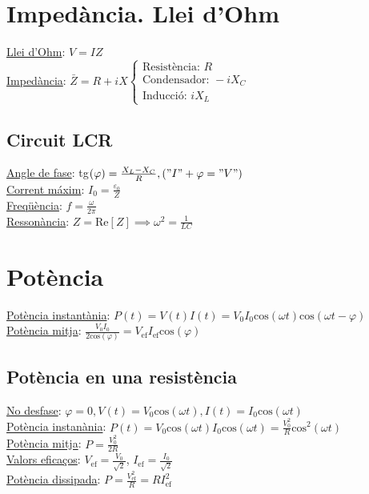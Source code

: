 \documentclass[10pt]{article}
\begin{document}
\begin{multicols}{5}
\section{Impedància. Llei d'Ohm}

\underline{Llei d'Ohm}: $V = IZ$ \\
\underline{Impedància}: $\bar{Z} = R + iX \begin{cases} \text{Resistència: } R \\ \text{Condensador: } -iX_C \\ \text{Inducció: } iX_L \end{cases}$

\subsection{Circuit LCR}

\underline{Angle de fase}: tg$(\varphi)=\frac{X_L-X_C}{R}, ("I" + \varphi = "V")$ \\
\underline{Corrent máxim}: $I_0 = \frac{\varepsilon_0}{Z}$ \\
\underline{Freqüència}: $f = \frac{\omega}{2\pi}$ \\
\underline{Ressonància}: $Z = \text{Re}[Z] \implies \omega^2 = \frac{1}{LC}$

\section{Potència}

\underline{Potència instantània}: $P(t) = V(t)I(t) = V_0I_0\text{cos}(\omega t)\text{cos}(\omega t - \varphi)$ \\
\underline{Potència mitja}: $\frac{V_0I_0}{2\text{cos}(\varphi)} = V_\text{ef}I_\text{ef}\text{cos}(\varphi)$

\subsection{Potència en una resistència}

\underline{No desfase}: $\varphi = 0, V(t) = V_0\text{cos}(\omega t), I(t) = I_0\text{cos}(\omega t)$ \\
\underline{Potència instanània}: $P(t) = V_0\text{cos}(\omega t)I_0\text{cos}(\omega t) = \frac{V_0^2}{R}\text{cos}^2(\omega t)$ \\
\underline{Potència mitja}: $P = \frac{V_0^2}{2R}$ \\
\underline{Valors eficaços}: $V_{\text{ef}} = \frac{V_0}{\sqrt{2}}$, $I_{\text{ef}} = \frac{I_0}{\sqrt{2}}$ \\
\underline{Potència dissipada}: $P = \frac{V_{\text{ef}}^2}{R} = RI_{\text{ef}}^2$


\end{multicols}
\end{document}
